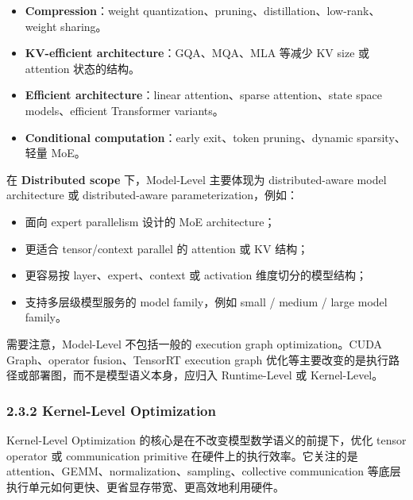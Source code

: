 \documentclass[a4paper,twocolumn,10pt]{ctexart}
\begin{document}
\begin{itemize}
\item \textbf{Compression}：weight quantization、pruning、distillation、low-rank、weight sharing。

\item \textbf{KV-efficient architecture}：GQA、MQA、MLA 等减少 KV size 或 attention 状态的结构。

\item \textbf{Efficient architecture}：linear attention、sparse attention、state space models、efficient Transformer variants。

\item \textbf{Conditional computation}：early exit、token pruning、dynamic sparsity、轻量 MoE。

\end{itemize}
在 \textbf{Distributed scope} 下，Model-Level 主要体现为 distributed-aware model architecture 或 distributed-aware parameterization，例如：


\begin{itemize}
\item 面向 expert parallelism 设计的 MoE architecture；

\item 更适合 tensor/context parallel 的 attention 或 KV 结构；

\item 更容易按 layer、expert、context 或 activation 维度切分的模型结构；

\item 支持多层级模型服务的 model family，例如 small / medium / large model family。

\end{itemize}
需要注意，Model-Level 不包括一般的 execution graph optimization。CUDA Graph、operator fusion、TensorRT execution graph 优化等主要改变的是执行路径或部署图，而不是模型语义本身，应归入 Runtime-Level 或 Kernel-Level。




\subsubsection{2.3.2 Kernel-Level Optimization}

Kernel-Level Optimization 的核心是在不改变模型数学语义的前提下，优化 tensor operator 或 communication primitive 在硬件上的执行效率。它关注的是 attention、GEMM、normalization、sampling、collective communication 等底层执行单元如何更快、更省显存带宽、更高效地利用硬件。
\end{document}
